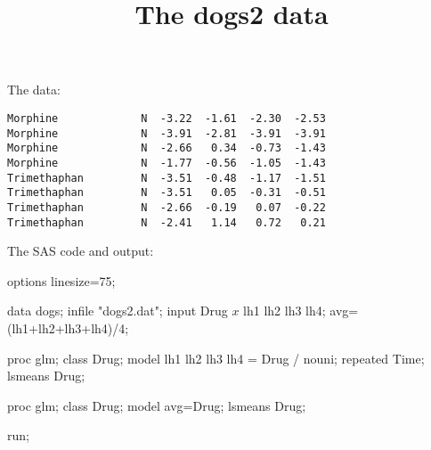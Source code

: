 \documentclass{article}
\title{The dogs2 data}
\begin{document}
\maketitle
The data:
\begin{verbatim}
Morphine             N  -3.22  -1.61  -2.30  -2.53
Morphine             N  -3.91  -2.81  -3.91  -3.91
Morphine             N  -2.66   0.34  -0.73  -1.43
Morphine             N  -1.77  -0.56  -1.05  -1.43
Trimethaphan         N  -3.51  -0.48  -1.17  -1.51
Trimethaphan         N  -3.51   0.05  -0.31  -0.51
Trimethaphan         N  -2.66  -0.19   0.07  -0.22
Trimethaphan         N  -2.41   1.14   0.72   0.21

\end{verbatim}
The SAS code and output:
\begin{Winput}
options linesize=75;

data dogs;
    infile "dogs2.dat";
    input Drug $ x $ lh1 lh2 lh3 lh4;
    avg=(lh1+lh2+lh3+lh4)/4;
    
proc glm;
    class Drug;
    model lh1 lh2 lh3 lh4 = Drug / nouni;
    repeated Time;
    lsmeans Drug;
    
proc glm;
    class Drug;
    model avg=Drug;
    lsmeans Drug;


run;
\end{Winput}
\end{document}
